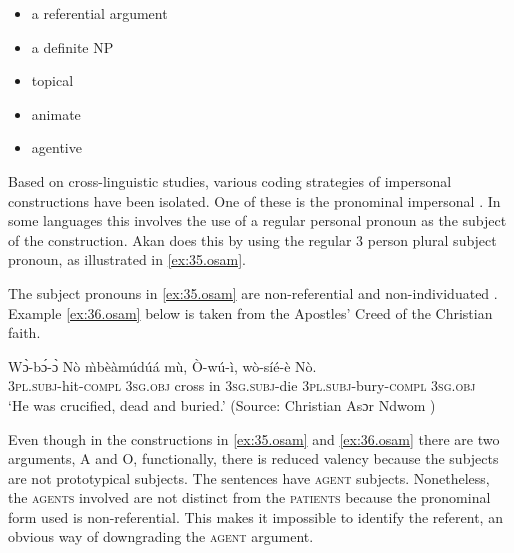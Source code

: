 \documentclass[output=paper]{langsci/langscibook}
\begin{document}
\begin{itemize}
 \item  a referential argument
 \item a definite NP
 \item topical
 \item animate
 \item  agentive
\end{itemize}


Based on cross-linguistic studies, various coding strategies of impersonal constructions have been isolated. One of these is the pronominal impersonal \citep{siewierska2011}. In some languages this involves the use of a regular personal pronoun as the subject of the construction. Akan does this by using the regular 3 person plural subject pronoun, as illustrated in \ref{ex:35.osam}.

\ea
\label{ex:35.osam}
	\z

	\z
\z



The subject pronouns in \ref{ex:35.osam} are non-referential and non-individuated \citep{hopperthompson1980}. Example \ref{ex:36.osam} below is taken from the Apostles' Creed of the Christian faith. 

\ea
\label{ex:36.osam}
\gll Wɔ̀-bɔ́-ɔ̀       Nò    \`{m}bèàmúdúá  mù, Ò-wú-ì,     wò-síé-è     Nò.\\
     \textsc{3pl.subj}-hit\textsc{-compl}  \textsc{3sg.obj}  cross in \textsc{3sg.subj}-die  \textsc{3pl.subj}-bury\textsc{-compl}  \textsc{3sg.obj}\\
\glt `He was crucified, dead and buried.' (Source: Christian Asɔr Ndwom \citep{methodist1937})
\z

Even though in the constructions in \ref{ex:35.osam} and \ref{ex:36.osam} there are two arguments, A and O, functionally, there is reduced valency because the subjects are not prototypical subjects. The sentences have \textsc{agent} subjects. Nonetheless, the \textsc{agents} involved are not distinct from the \textsc{patients} because the pronominal form used is non-referential. This makes it impossible to identify the referent, an obvious way of downgrading the \textsc{agent} argument.
\end{document}
